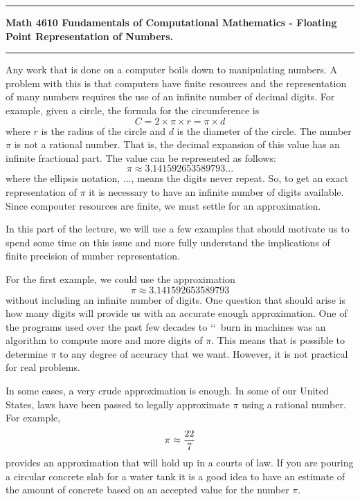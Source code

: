 \documentclass[10pt,fleqn]{article}
\begin{document}
\vskip0.1in\hrule\vskip0.1in
\noindent
{\bf Math 4610 Fundamentals of Computational Mathematics  -  Floating Point 
    Representation of Numbers.}  
\vskip0.1in\hrule\vskip0.1in
\noindent
Any work that is done on a computer boils down to manipulating numbers. A
problem with this is that computers have finite resources and the representation
of many numbers requires the use of an infinite number of decimal digits. For
example, given a circle, the formula for the circumference is
$$C = 2 \times \pi \times r = \pi \times d$$
where $r$ is the radius of the circle and $d$ is the diameter of the circle. The
number $\pi$ is not a rational number. That is, the decimal expansion of this
value has an infinite fractional part. The value can be represented as follows:
$$\pi\approx 3.141592653589793...$$
where the ellipsis notation, $...$, means the digits never repeat. So, to get an
exact representation of $\pi$ it is necessary to have an infinite number of
digits available. Since compouter resources are finite, we must settle for an
approximation.

In this part of the lecture, we will use a few examples that should motivate us
to spend some time on this issue and more fully understand the implications of
finite precision of number representation.

For the first example, we could use the approximation
$$\pi\approx 3.141592653589793$$
without including an infinite number of digits. One question that should arise
is how many digits will provide us with an accurate enough approximation. One
of the programs used over the past few decades to \lq\lq\ burn in machines was
an algorithm to compute more and more digits of $\pi$. This means that is
possible to determine $\pi$ to any degree of accuracy that we want. However, it
is not practical for real problems.

In some cases, a very crude approximation is enough. In some of our United
States, laws have been passed to legally approximate $\pi$ using a rational
number. For example,
$$\pi\approx {{22}\over 7}$$
provides an approximation that will hold up in a courts of law. If you are
pouring a circular concrete slab for a water tank it is a good idea to have an
estimate of the amount of concrete based on an accepted value for the number
$\pi$.
\end{document}
